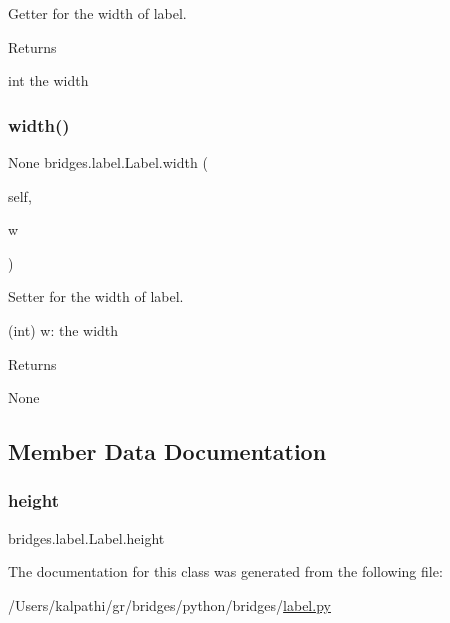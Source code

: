 Getter for the width of label. 

\begin{DoxyReturn}{Returns}


int the width 
\end{DoxyReturn}
\mbox{\label{classbridges_1_1label_1_1_label_ab3fb90af5f83440eb79434422f63cb5c}} 
\subsubsection{\texorpdfstring{width()}{width()}\hspace{0.1cm}{\footnotesize\ttfamily [2/2]}}
{\footnotesize\ttfamily  None bridges.\+label.\+Label.\+width (\begin{DoxyParamCaption}\item[{}]{self,  }\item[{int}]{w }\end{DoxyParamCaption})}



Setter for the width of label. 

\begin{DoxyVerb}       (int) w: the width
\end{DoxyVerb}
 \begin{DoxyReturn}{Returns}


None 
\end{DoxyReturn}


\subsection{Member Data Documentation}
\mbox{\label{classbridges_1_1label_1_1_label_a2bf622aa77b4ad7d6918db99a8bfd4da}} 
\subsubsection{\texorpdfstring{height}{height}}
{\footnotesize\ttfamily bridges.\+label.\+Label.\+height}



The documentation for this class was generated from the following file\+:\begin{DoxyCompactItemize}
\item 
/\+Users/kalpathi/gr/bridges/python/bridges/\mbox{\hyperlink{label_8py}{label.\+py}}\end{DoxyCompactItemize}
